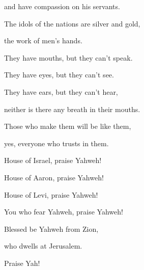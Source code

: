 {\par }{\QB and have compassion on his servants.
\par }{\BB \par }{\Q {}The idols of the nations are silver and gold,
\par }{\QB the work of men’s hands.
\par }{\Q {}They have mouths, but they can’t speak.
\par }{\QB They have eyes, but they can’t see.
\par }{\Q {}They have ears, but they can’t hear,
\par }{\QB neither is there any breath in their mouths.
\par }{\Q {}Those who make them will be like them,
\par }{\QB yes, everyone who trusts in them.
\par }{\Q {}House of Israel, praise Yahweh!
\par }{\QB House of Aaron, praise Yahweh!
\par }{\Q {}House of Levi, praise Yahweh!
\par }{\QB You who fear Yahweh, praise Yahweh!
\par }{\Q {}Blessed be Yahweh from Zion,
\par }{\QB who dwells at Jerusalem.
\par }{\Q Praise Yah!

}
